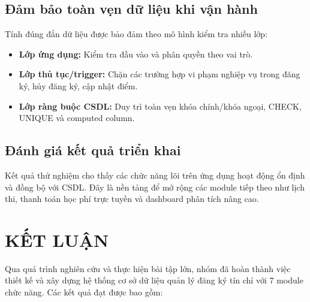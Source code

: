 \documentclass[13pt, a4paper]{article}
\begin{document}
\subsection{Đảm bảo toàn vẹn dữ liệu khi vận hành}

\noindent Tính đúng đắn dữ liệu được bảo đảm theo mô hình kiểm tra nhiều lớp:
\begin{itemize}[leftmargin=1.5cm]
  \item \textbf{Lớp ứng dụng:} Kiểm tra đầu vào và phân quyền theo vai trò.
  \item \textbf{Lớp thủ tục/trigger:} Chặn các trường hợp vi phạm nghiệp vụ trong đăng ký, hủy đăng ký, cập nhật điểm.
  \item \textbf{Lớp ràng buộc CSDL:} Duy trì toàn vẹn khóa chính/khóa ngoại, CHECK, UNIQUE và computed column.
\end{itemize}

\subsection{Đánh giá kết quả triển khai}

\noindent Kết quả thử nghiệm cho thấy các chức năng lõi trên ứng dụng hoạt động ổn định và đồng bộ với CSDL. Đây là nền tảng để mở rộng các module tiếp theo như lịch thi, thanh toán học phí trực tuyến và dashboard phân tích nâng cao.

\newpage
\section*{KẾT LUẬN}

\noindent Qua quá trình nghiên cứu và thực hiện bài tập lớn, nhóm đã hoàn thành việc thiết kế và xây dựng hệ thống cơ sở dữ liệu quản lý đăng ký tín chỉ với 7 module chức năng. Các kết quả đạt được bao gồm:
\end{document}
